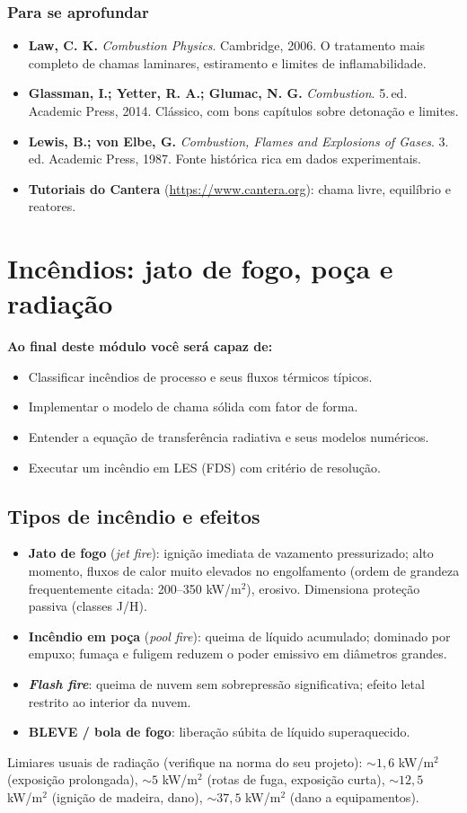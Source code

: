 \documentclass[10pt,a4paper,twocolumn,openany]{report}
\newenvironment{conceito}[1]{\section{#1}}{\par}
\newenvironment{aprofundar}{\subsection*{\textcolor{amarelo}{Para se aprofundar}}\small}{\par}
\newcommand{\objetivos}{\noindent\textbf{Ao final deste módulo você será capaz de:}}
\begin{document}
\begin{aprofundar}
\begin{itemize}[leftmargin=*]
  \item \textbf{Law, C. K.} \emph{Combustion Physics}. Cambridge, 2006. O tratamento mais completo de chamas laminares, estiramento e limites de inflamabilidade.
  \item \textbf{Glassman, I.; Yetter, R. A.; Glumac, N. G.} \emph{Combustion}. 5.\,ed. Academic Press, 2014. Clássico, com bons capítulos sobre detonação e limites.
  \item \textbf{Lewis, B.; von Elbe, G.} \emph{Combustion, Flames and Explosions of Gases}. 3.\,ed. Academic Press, 1987. Fonte histórica rica em dados experimentais.
  \item \textbf{Tutoriais do Cantera} (\url{https://www.cantera.org}): chama livre, equilíbrio e reatores.
\end{itemize}
\end{aprofundar}

\chapter{Incêndios: jato de fogo, poça e radiação}

\objetivos
\begin{itemize}
  \item Classificar incêndios de processo e seus fluxos térmicos típicos.
  \item Implementar o modelo de chama sólida com fator de forma.
  \item Entender a equação de transferência radiativa e seus modelos numéricos.
  \item Executar um incêndio em LES (FDS) com critério de resolução.
\end{itemize}

\begin{conceito}{Tipos de incêndio e efeitos}
\begin{itemize}
  \item \textbf{Jato de fogo} (\emph{jet fire}): ignição imediata de vazamento
        pressurizado; alto momento, fluxos de calor muito elevados no
        engolfamento (ordem de grandeza frequentemente citada: 200--350 kW/m$^2$),
        erosivo. Dimensiona proteção passiva (classes J/H).
  \item \textbf{Incêndio em poça} (\emph{pool fire}): queima de líquido
        acumulado; dominado por empuxo; fumaça e fuligem reduzem o poder
        emissivo em diâmetros grandes.
  \item \textbf{\emph{Flash fire}}: queima de nuvem sem sobrepressão
        significativa; efeito letal restrito ao interior da nuvem.
  \item \textbf{BLEVE / bola de fogo}: liberação súbita de líquido
        superaquecido.
\end{itemize}
Limiares usuais de radiação (verifique na norma do seu projeto): $\sim1{,}6$
kW/m$^2$ (exposição prolongada), $\sim5$ kW/m$^2$ (rotas de fuga, exposição
curta), $\sim12{,}5$ kW/m$^2$ (ignição de madeira, dano), $\sim37{,}5$ kW/m$^2$
(dano a equipamentos).
\end{conceito}
\end{document}
